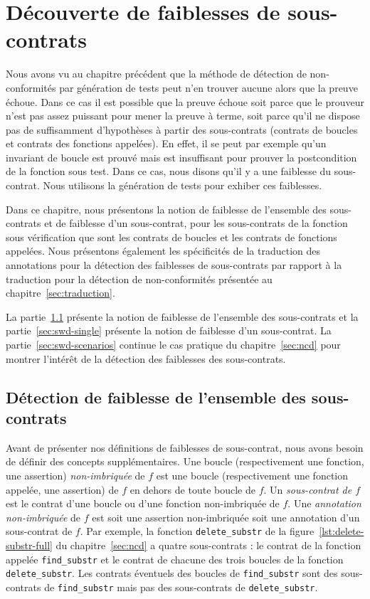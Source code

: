 
\chapter{Découverte de faiblesses de sous-contrats}
\label{sec:swd}

\chapterintro

Nous avons vu au chapitre précédent que la méthode de détection de
non-conformités par génération de tests peut n'en trouver aucune alors que la
preuve échoue.
Dans ce cas il est possible que la preuve échoue soit parce que le prouveur
n'est pas assez puissant pour mener la preuve à terme, soit parce qu'il ne
dispose pas de suffisamment d'hypothèses à partir des sous-contrats (contrats
de boucles et contrats des fonctions appelées).
En effet, il se peut par exemple qu'un invariant de boucle est prouvé mais est
insuffisant pour prouver la postcondition de la fonction sous test.
Dans ce cas, nous disons qu'il y a une faiblesse du sous-contrat.
Nous utilisons la génération de tests pour exhiber ces faiblesses.

Dans ce chapitre, nous présentons la notion de faiblesse de l'ensemble des
sous-contrats et de faiblesse d'un sous-contrat, pour les sous-contrats de la
fonction sous vérification que sont les contrats de boucles et les contrats
de fonctions appelées.
Nous présentons également les spécificités de la traduction des annotations pour
la détection des faiblesses de sous-contrats par rapport à la traduction pour la
détection de non-conformités présentée au chapitre~\ref{sec:traduction}.

La partie~\ref{sec:swd-global} présente la notion de faiblesse de l'ensemble des
sous-contrats et la partie~\ref{sec:swd-single} présente la notion de faiblesse
d'un sous-contrat.
La partie~\ref{sec:swd-scenarios} continue le cas pratique du
chapitre~\ref{sec:ncd} pour montrer l'intérêt de la détection des faiblesses
des sous-contrats.


\section{Détection de faiblesse de l'ensemble des sous-contrats}
\label{sec:swd-global}


Avant de présenter nos définitions de faiblesses de sous-contrat, nous avons
besoin de définir des concepts supplémentaires.
Une boucle (respectivement une fonction, une assertion) \emph{non-imbriquée} de
$f$ est une boucle (respectivement une fonction appelée, une assertion) de $f$
en dehors de toute boucle de $f$.
Un \emph{sous-contrat de $f$} est le contrat d'une boucle ou d'une fonction
non-imbriquée de $f$.
Une \emph{annotation non-imbriquée} de $f$ est soit une assertion non-imbriquée
soit une annotation d'un sous-contrat de $f$.
Par exemple, la fonction \lstinline'delete_substr' de la
figure~\ref{lst:delete-substr-full} du chapitre~\ref{sec:ncd} a quatre
sous-contrats : le contrat de la fonction appelée \lstinline'find_substr' et le
contrat de chacune des trois boucles de la fonction \lstinline'delete_substr'.
Les contrats éventuels des boucles de \lstinline'find_substr' sont des
sous-contrats de \lstinline'find_substr' mais pas des sous-contrats de
\lstinline'delete_substr'.

